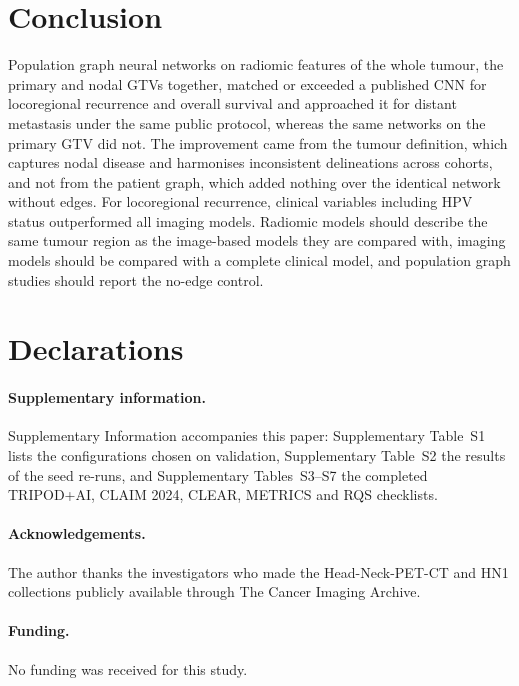 \documentclass[11pt,a4paper]{article}
\begin{document}
\section{Conclusion}\label{sec:conclusion}
Population graph neural networks on radiomic features of the whole tumour, the primary and nodal GTVs together, matched or exceeded a published CNN for locoregional recurrence and overall survival and approached it for distant metastasis under the same public protocol, whereas the same networks on the primary GTV did not. The improvement came from the tumour definition, which captures nodal disease and harmonises inconsistent delineations across cohorts, and not from the patient graph, which added nothing over the identical network without edges. For locoregional recurrence, clinical variables including HPV status outperformed all imaging models. Radiomic models should describe the same tumour region as the image-based models they are compared with, imaging models should be compared with a complete clinical model, and population graph studies should report the no-edge control.

\section*{Declarations}

\paragraph{Supplementary information.}Supplementary Information accompanies this paper: Supplementary Table~S1 lists the configurations chosen on validation, Supplementary Table~S2 the results of the seed re-runs, and Supplementary Tables~S3--S7 the completed TRIPOD+AI, CLAIM 2024, CLEAR, METRICS and RQS checklists.

\paragraph{Acknowledgements.}The author thanks the investigators who made the Head-Neck-PET-CT and HN1 collections publicly available through The Cancer Imaging Archive.

\paragraph{Funding.}No funding was received for this study.
\end{document}
